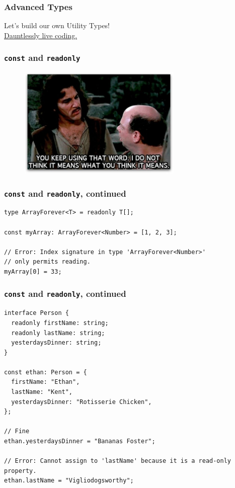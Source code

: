 \documentclass[aspectratio=169]{beamer}
\begin{document}
\begin{frame}[fragile]
  \frametitle{Advanced Types}

  Let's build our own Utility Types! \\

  \href{https://bit.ly/3a5OVs1}{Dauntlessly live coding.}
\end{frame}

\begin{frame}[fragile]
  \frametitle{\texttt{const} and \texttt{readonly}}
  \begin{figure}
    \href{https://bit.ly/32dLNpz}{\includegraphics[width=0.7\textwidth]{using_that_word.jpg}}
  \end{figure}
\end{frame}

\begin{frame}[fragile]
  \frametitle{\texttt{const} and \texttt{readonly}, continued}

  \begin{verbatim}
type ArrayForever<T> = readonly T[];

const myArray: ArrayForever<Number> = [1, 2, 3];

// Error: Index signature in type 'ArrayForever<Number>'
// only permits reading.
myArray[0] = 33;

  \end{verbatim}
\end{frame}

\begin{frame}[fragile]
  \frametitle{\texttt{const} and \texttt{readonly}, continued}
  \small

  \begin{verbatim}
interface Person {
  readonly firstName: string;
  readonly lastName: string;
  yesterdaysDinner: string;
}

const ethan: Person = {
  firstName: "Ethan",
  lastName: "Kent",
  yesterdaysDinner: "Rotisserie Chicken",
};

// Fine
ethan.yesterdaysDinner = "Bananas Foster";

// Error: Cannot assign to 'lastName' because it is a read-only property.
ethan.lastName = "Vigliodogsworthy";

  \end{verbatim}
\end{frame}
\end{document}
